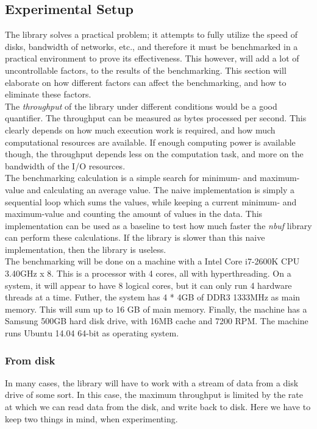\documentclass[a4paper]{article}
\newcommand{\nbuf}{\textit{nbuf} }
\begin{document}
\subsection{Experimental Setup}
The library solves a practical problem; it attempts to fully utilize the speed of disks, bandwidth of networks, etc., and therefore it must be benchmarked in a practical environment to prove its effectiveness. This however, will add a lot of uncontrollable factors, to the results of the benchmarking. This section will elaborate on how different factors can affect the benchmarking, and how to eliminate these factors.\\

The \textit{throughput} of the library under different conditions would be a good quantifier. The throughput can be measured as bytes processed per second. This clearly depends on how much execution work is required, and how much computational resources are available. If enough computing power is available though, the throughput depends less on the computation task, and more on the bandwidth of the I/O resources.\\

The benchmarking calculation is a simple search for minimum- and maximum-value and calculating an average value. The naive implementation is simply a sequential loop which sums the values, while keeping a current minimum- and maximum-value and counting the amount of values in the data. This implementation can be used as a baseline to test how much faster the \nbuf library can perform these calculations. If the library is slower than this naive implementation, then the library is useless.\\

The benchmarking will be done on a machine with a Intel Core i7-2600K CPU 3.40GHz x 8. This is a processor with 4 cores, all with hyperthreading. On a system, it will appear to have 8 logical cores, but it can only run 4 hardware threads at a time. Futher, the system has 4 * 4GB of DDR3 1333MHz as main memory. This will sum up to 16 GB of main memory. Finally, the machine has a Samsung 500GB hard disk drive, with 16MB cache and 7200 RPM. The machine runs Ubuntu 14.04 64-bit as operating system. 


\subsubsection{From disk}
In many cases, the library will have to work with a stream of data from a disk drive of some sort. In this case, the maximum throughput is limited by the rate at which we can read data from the disk, and write back to disk. Here we have to keep two things in mind, when experimenting.\\
\end{document}
